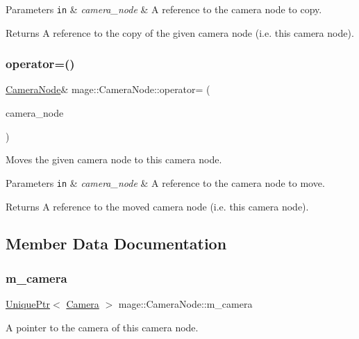 \begin{DoxyParams}[1]{Parameters}
\mbox{\tt in}  & {\em camera\+\_\+node} & A reference to the camera node to copy. \\
\hline
\end{DoxyParams}
\begin{DoxyReturn}{Returns}
A reference to the copy of the given camera node (i.\+e. this camera node). 
\end{DoxyReturn}
\hypertarget{classmage_1_1_camera_node_a8da019549eeac6c4d7d6d7c4017dd498}{}\label{classmage_1_1_camera_node_a8da019549eeac6c4d7d6d7c4017dd498} 
\subsubsection{\texorpdfstring{operator=()}{operator=()}\hspace{0.1cm}{\footnotesize\ttfamily [2/2]}}
{\footnotesize\ttfamily \hyperlink{classmage_1_1_camera_node}{Camera\+Node}\& mage\+::\+Camera\+Node\+::operator= (\begin{DoxyParamCaption}\item[{\hyperlink{classmage_1_1_camera_node}{Camera\+Node} \&\&}]{camera\+\_\+node }\end{DoxyParamCaption})\hspace{0.3cm}{\ttfamily [delete]}}

Moves the given camera node to this camera node.


\begin{DoxyParams}[1]{Parameters}
\mbox{\tt in}  & {\em camera\+\_\+node} & A reference to the camera node to move. \\
\hline
\end{DoxyParams}
\begin{DoxyReturn}{Returns}
A reference to the moved camera node (i.\+e. this camera node). 
\end{DoxyReturn}


\subsection{Member Data Documentation}
\hypertarget{classmage_1_1_camera_node_a18f00f7ccd0c677043e11a1b3085dbfb}{}\label{classmage_1_1_camera_node_a18f00f7ccd0c677043e11a1b3085dbfb} 
\subsubsection{\texorpdfstring{m\+\_\+camera}{m\_camera}}
{\footnotesize\ttfamily \hyperlink{namespacemage_a3316d7143a973e37adf1110f2e80ca31}{Unique\+Ptr}$<$ \hyperlink{classmage_1_1_camera}{Camera} $>$ mage\+::\+Camera\+Node\+::m\+\_\+camera\hspace{0.3cm}{\ttfamily [private]}}

A pointer to the camera of this camera node. 